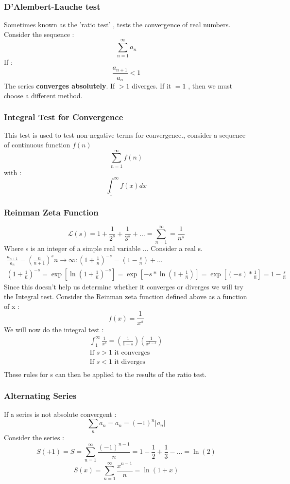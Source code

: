 \documentclass{article}
\newcommand{\be}{\begin{equation}}
\newcommand{\ee}{\end{equation}}
\begin{document}
\subsubsection*{D'Alembert-Lauche test}
Sometimes known as the 'ratio test' , tests the convergence of real numbers. Consider the sequence :
\be
\sum_{n=1}^{\infty}a_n
\ee
If :
\be
\frac{a_{n+1}}{a_n} < 1
\ee
The series \textbf{converges absolutely}. If $>1$ diverges.
If it $=1$ , then we must choose a different method.
\subsubsection*{Integral Test for Convergence}
This test is used to test non-negative terms for convergence., consider a sequence of continuous function $f(n)$
\be
\sum_{n=1}^{\infty} f(n)
\ee
with :
\be
\int_{1}^{\infty}f(x)dx
\ee
\subsubsection*{Reinman Zeta Function}
\be
\mathcal{L}(s) = 1 + \frac{1}{2^s} + \frac{1}{3^s}+ \hdots = \sum_{n=1}^{\infty} = \frac{1}{n^s}
\ee
Where s is an integer of a simple real variable ...
Consider a real s.
\be
\begin{split}
\frac{a_{n+1}}{a_n}= \left(\frac{n}{n+1}\right)^s {n \to \infty}:  \left(1+\frac{1}{n}\right)^{-s} = \left( 1 - \frac{s}{n}\right)+ \hdots \\
\left(1 + \frac{1}{n}\right)^{-s} = \exp\left[{\ln{\left(1+\frac{1}{n}\right)^{-s}}}\right] = \exp\left[-s*{\ln{\left(1+\frac{1}{n}\right)^{}}}\right] = \exp\left[(-s)*\frac{1}{n}\right]=1 - \frac{s}{n}
\end{split}
\ee
Since this doesn't help us determine whether it converges or diverges we will try the Integral test.
Consider the Reinman zeta function defined above as a function of x :
\be
f(x) = \frac{1}{x^s}
\ee
We will now do the integral test :
\be
\begin{split}
    \int_1^\infty \frac{1}{x^s} = \left(\frac{1}{1-s}\right)\left(\frac{1}{x^{1-s}}\right) \\
    \text{If } s>1  \text{ it converges} \\
    \text{If } s<1 \text{ it diverges} \\
\end{split}
\ee
These rules for s can then be applied to the results of the ratio test.
\subsubsection*{Alternating Series}
If a series is not absolute convergent :
\be
\sum_n a_n = a_n = (-1)^n |a_n|
\ee
Consider  the series :
\be
S(+1) = S = \sum_{n=1}^\infty \frac{(-1)^{n-1}}{n} = 1 - \frac{1}{2} + \frac{1}{3} - \hdots = \ln(2)
\ee
\be
S(x) = \sum_{n=1}^\infty \frac{x^{n-1}}{n} = \ln(1+x)
\ee
\end{document}
